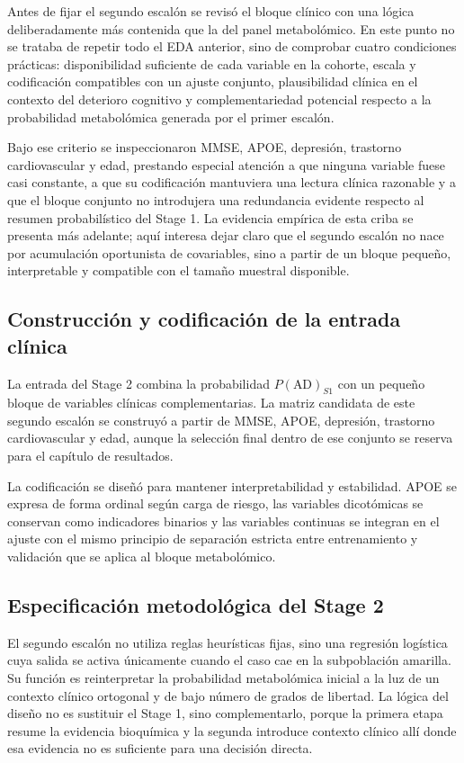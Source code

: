 Antes de fijar el segundo escalón se revisó el bloque clínico con una lógica deliberadamente más contenida que la del
panel metabolómico. En este punto no se trataba de repetir todo el EDA anterior, sino de comprobar cuatro condiciones
prácticas: disponibilidad suficiente de cada variable en la cohorte, escala y codificación compatibles con un ajuste
conjunto, plausibilidad clínica en el contexto del deterioro cognitivo y complementariedad potencial respecto a la
probabilidad metabolómica generada por el primer escalón.

Bajo ese criterio se inspeccionaron MMSE, APOE, depresión, trastorno cardiovascular y edad, prestando especial atención a que ninguna
variable fuese casi constante, a que su codificación mantuviera una lectura clínica razonable y a que el bloque conjunto
no introdujera una redundancia evidente respecto al resumen probabilístico del Stage 1. La evidencia empírica de esta
criba se presenta más adelante; aquí interesa dejar claro que el segundo escalón no nace por acumulación oportunista de
covariables, sino a partir de un bloque pequeño, interpretable y compatible con el tamaño muestral disponible.

\subsection{Construcción y codificación de la entrada clínica}

La entrada del Stage 2 combina la probabilidad $P(\text{AD})_{S1}$ con un pequeño bloque de variables clínicas
complementarias. La matriz candidata de este segundo escalón se construyó a partir de MMSE, APOE, depresión,
trastorno cardiovascular y edad, aunque la selección final dentro de ese conjunto se reserva para el capítulo de resultados.

La codificación se diseñó para mantener interpretabilidad y estabilidad. APOE se expresa de forma ordinal según carga de
riesgo, las variables dicotómicas se conservan como indicadores binarios y las variables continuas se integran en el
ajuste con el mismo principio de separación estricta entre entrenamiento y validación que se aplica al bloque
metabolómico.

\subsection{Especificación metodológica del Stage 2}

El segundo escalón no utiliza reglas heurísticas fijas, sino una regresión logística cuya salida se activa únicamente
cuando el caso cae en la subpoblación amarilla. Su función es reinterpretar la probabilidad metabolómica inicial a la
luz de un contexto clínico ortogonal y de bajo número de grados de libertad. La lógica del diseño no es sustituir el
Stage 1, sino complementarlo, porque la primera etapa resume la evidencia bioquímica y la segunda introduce contexto
clínico allí donde esa evidencia no es suficiente para una decisión directa.


